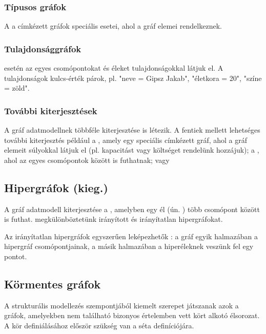 \subsubsection{Típusos gráfok}

A  a címkézett gráfok speciális esetei, ahol a gráf elemei 
  rendelkeznek.
 
\subsubsection{Tulajdonsággráfok}

 esetén az egyes csomópontokat és éleket tulajdonságokkal látjuk el. A tulajdonságok kulcs-érték párok, pl. "neve = Gipsz Jakab", "életkora = 20", "színe = zöld".

\subsubsection{További kiterjesztések}

A gráf adatmodellnek többféle kiterjesztése is létezik. A fentiek mellett lehetséges további kiterjesztés például a , amely egy speciális címkézett gráf, ahol a gráf elemeit súlyokkal látjuk el (pl. kapacitást vagy költséget rendelünk hozzájuk); a , ahol az egyes csomópontok között  is futhatnak; vagy 

\subsection{Hipergráfok (kieg.)}

A gráf adatmodell kiterjesztése a , amelyben egy él (ún. ) több csomópont között is futhat. megkülönböztetünk irányított és irányítatlan hipergráfokat.

Az irányítatlan hipergráfok egyszerűen leképezhetők : a gráf egyik halmazában a hipergráf csomópontjainak, a másik halmazában a hiperéleknek veszünk fel egy pontot.



\subsection{Körmentes gráfok}

A strukturális modellezés szempontjából kiemelt szerepet játszanak azok a gráfok, amelyekben nem található bizonyos értelemben vett kört alkotó élsorozat. A kör definiálásához először szükség van a séta definíciójára.

